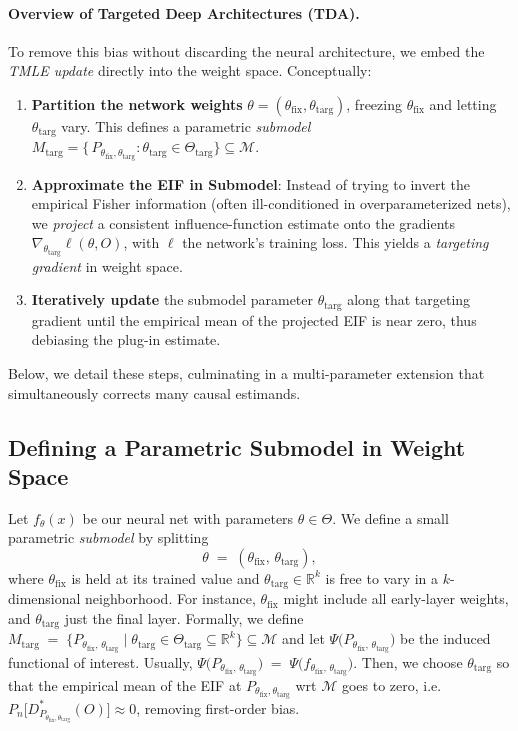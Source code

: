 \documentclass{article}
\theoremstyle{remark}
\newcommand{\R}{\mathbb{R}}
\begin{document}
\paragraph{Overview of Targeted Deep Architectures (TDA).}
To remove this bias without discarding the neural architecture, we embed the \emph{TMLE update} directly into the weight space.  Conceptually:

\begin{enumerate}[leftmargin=1.5em,label=(\arabic*)]
  \item \textbf{Partition the network weights} 
    $\theta = (\theta_{\text{fix}},\theta_{\text{targ}})$, freezing $\theta_{\text{fix}}$ and letting $\theta_{\text{targ}}$ vary.  This defines a parametric \emph{submodel} $M_{\text{targ}} = \{\,P_{\theta_{\text{fix}},\theta_{\text{targ}}}\colon \theta_{\text{targ}}\in\Theta_{\text{targ}}\}\subseteq\mathcal{M}$.
  \item \textbf{Approximate the EIF in Submodel}: Instead of trying to invert the empirical Fisher information (often ill-conditioned in overparameterized nets), we \emph{project} a consistent influence-function estimate onto the gradients $\nabla_{\theta_{\text{targ}}}\ell(\theta,O)$, with $\ell$ the network’s training loss.  This yields a \emph{targeting gradient} in weight space.
  \item \textbf{Iteratively update} the submodel parameter $\theta_{\text{targ}}$ along that targeting gradient until the empirical mean of the projected EIF is near zero, thus debiasing the plug-in estimate.
\end{enumerate}

Below, we detail these steps, culminating in a multi-parameter extension that simultaneously corrects many causal estimands.

\subsection{Defining a Parametric Submodel in Weight Space}
\label{sec:method:param_submodel}

Let $f_{\theta}(x)$ be our neural net with parameters $\theta\in\Theta$.  We define a small parametric \emph{submodel} by splitting
\[
  \theta \;=\; (\theta_{\text{fix}},\,\theta_{\text{targ}}),
\]
where $\theta_{\text{fix}}$ is held at its trained value and $\theta_{\text{targ}} \in \R^k$ is free to vary in a $k$-dimensional neighborhood.  For instance, $\theta_{\text{fix}}$ might include all early-layer weights, and $\theta_{\text{targ}}$ just the final layer. Formally, we define
$M_{\text{targ}}
  \;=\;
  \bigl\{
    P_{\theta_{\text{fix}},\,\theta_{\text{targ}}}
    \;\big|\;
    \theta_{\text{targ}} \in \Theta_{\text{targ}} \subseteq \R^k
  \bigr\}\subseteq \mathcal{M}$ and let $\Psi\bigl(P_{\theta_{\text{fix}},\,\theta_{\text{targ}}}\bigr)$ be the induced functional of interest. Usually, $\Psi\bigl(P_{\theta_{\text{fix}},\,\theta_{\text{targ}}}\bigr)\;=\;
\Psi\bigl(f_{\theta_{\text{fix}},\,\theta_{\text{targ}}}\bigr)$. Then, we choose $\theta_{\text{targ}}$ so that the empirical mean of the EIF at $P_{\theta_{\text{fix}},\theta_{\text{targ}}}$ wrt $\mathcal{M}$ goes to zero, i.e.\ $P_n\bigl[D^*_{P_{\theta_{\text{fix}},\theta_{\text{targ}}}}(O)\bigr]\approx0$, removing first-order bias.
\end{document}

